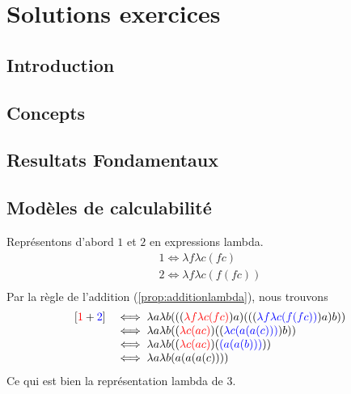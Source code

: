 
\chapter{Solutions exercices}
\label{ch:solExer}

%

\section{Introduction}





\section{Concepts}




\section{Resultats Fondamentaux}




\section{Modèles de calculabilité}

Représentons d'abord \(1\) et \(2\) en expressions lambda.
$$\begin{array}{ll}
	1 \iff \lambda f \lambda c (fc)\\
	2 \iff \lambda f \lambda c (f(fc))\\
\end{array}$$
Par la règle de l'addition (\ref{prop:additionlambda}), nous trouvons
$$\begin{array}{ll}
	[\textcolor{red}{1}+\textcolor{blue}{2}] & \iff \lambda a \lambda b ( ( ( \textcolor{red}{\lambda f \lambda c (fc)} )a ) ( ( ( \textcolor{blue}{\lambda f \lambda c (f(fc))})a)b) ) \\
	& \iff \lambda a \lambda b ((\textcolor{red}{\lambda c (a c)}) ((\textcolor{blue}{\lambda c (a(a(c)))})b)) \\
	& \iff \lambda a \lambda b ((\textcolor{red}{\lambda c (a c)}) (\textcolor{blue}{(a(a(b)))}))\\
	& \iff \lambda a \lambda b (a(a(a(c))))
\end{array}$$
Ce qui est bien la représentation lambda de \(3\).
